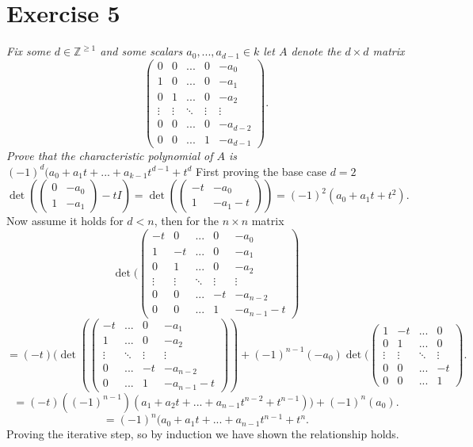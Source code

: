 \documentclass{article}
\begin{document}
    \section{Exercise 5}
    \emph{Fix some $d \in \mathbb{Z}^{\ge 1}$ and some scalars $a_0,...,a_{d-1} \in k$ let $A$ 
        denote the $d \times d$ matrix
        \[
            \begin{pmatrix} 0 & 0 & ... & 0 & -a_0 \\
                1 & 0 & ... & 0 & -a_1\\
                0 & 1 & ... & 0 & -a_2\\
                \vdots & \vdots & \ddots & \vdots & \vdots\\
                0 & 0 & ... & 0 & -a_{d-2}\\
                0 & 0 & ... & 1 & -a_{d-1}
            \end{pmatrix}
        .\] 
    Prove that the characteristic polynomial of $A$ is $(-1)^{d}(a_0+a_1t+...+a_{k-1}t^{d-1} + t^{d}$
    }
    First proving the base case $d = 2$
     \[
         \det( \begin{pmatrix} 0 & -a_0 \\ 1 & -a_1 \end{pmatrix} - tI) = \det( \begin{pmatrix} -t & -a_0 \\ 1 & -a_1 - t \end{pmatrix} ) = (-1)^2(a_0+a_1t+t^2)
    .\] 
    Now assume it holds for $d < n$, then for the $n \times n$ matrix
    \[
    \det( \begin{pmatrix} 
        -t & 0 & ... & 0 & -a_0\\
        1 & -t & ... & 0 & -a_1\\
        0 & 1 & ... & 0 & -a_2\\
        \vdots & \vdots & \ddots & \vdots & \vdots\\
        0 & 0 & ... & -t & -a_{n-2}\\
        0 & 0 & ... & 1 & -a_{n-1} - t
    \end{pmatrix} 
    \]
    \[
    = (-t)(\det( \begin{pmatrix} 
         -t & ... & 0 & -a_1\\
         1 & ... & 0 & -a_2\\
         \vdots & \ddots & \vdots & \vdots\\
         0 & ... & -t & -a_{n-2}\\
         0 & ... & 1 & -a_{n-1} - t
    \end{pmatrix} ) + (-1)^{n-1}(-a_0)\det( \begin{pmatrix} 
        1 & -t & ... & 0 \\
        0 & 1 & ... & 0 \\
        \vdots & \vdots & \ddots & \vdots \\
        0 & 0 & ... & -t \\
        0 & 0 & ... & 1 
     \end{pmatrix} 
    .\] 
    \[
        = (-t)((-1)^{n-1})(a_1+a_2t+...+a_{n-1}t^{n-2} + t^{n-1})) + (-1)^{n}(a_0)
    .\] 
    \[
        = (-1)^{n}(a_0+a_1t+...+a_{n-1}t^{n-1}+ t^{n}
    .\] 
    Proving the iterative step, so by induction we have shown the relationship holds.
\end{document}
